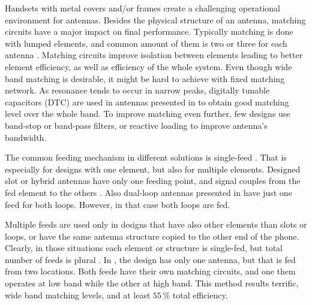 Handsets with metal covers and/or frames create a challenging operational environment for antennas. Besides the physical structure of an antenna, matching circuits have a major impact on final performance. Typically matching is done with lumped elements, and common amount of them is two or three for each antenna \cite{stanley_lte_mimo, zhong_pier, wu_pier}. Matching circuits improve isolation between elements leading to better element efficiency, as well as efficiency of the whole system. Even though wide band matching is desirable, it might be hard to achieve with fixed matching network. As resonance tends to occur in narrow peaks, digitally tunable capacitors (DTC) are used in antennas presented in \cite{chen_compact_lte,wu_tunable} to obtain good matching level over the whole band. To improve matching even further, few designs use band-stop \cite{lee_monopole, wu_pier} or band-pass \cite{chen_metal_frame} filters, or reactive loading \cite{chen_compact_lte, chen_metal_frame} to improve antenna's bandwidth.

The common feeding mechanism in different solutions is single-feed \cite{wu_tunable, chen_metal_frame, lee_monopole, chen_compact_lte,hepta_ifa}. That is especially for designs with one element, but also for multiple elements. Designed slot or hybrid antennas have only one feeding point, and signal couples from the fed element to the others \cite{son_wideband_mimo,hsu_compact,zhong_pier,yuan_slot}. Also dual-loop antennas presented in \cite{stanley_lte_mimo,ban_dual_loop,hybrid} have just one feed for both loops. However, in that case both loops are fed. 

Multiple feeds are used only in designs that have also other elements than slots or loops, or have the same antenna structure copied to the other end of the phone. Clearly, in those situations each element or structure is single-fed, but total number of feeds is plural \cite{stanley_lte_mimo, son_wideband_mimo,reconf_narrow}. In \cite{valkonen_multifeed}, the design has only one antenna, but that is fed from two locations. Both feeds have their own matching circuits, and one them operates at low band while the other at high band. This method results terrific, wide band matching levels, and at least $55\,\%$ total efficiency.

